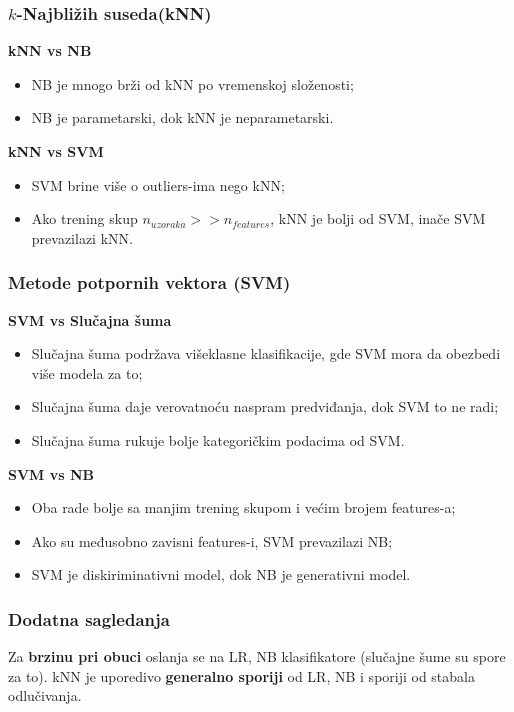 \documentclass[fontsize=12bp, paper=a4]{scrarticle}
\begin{document}
\subsubsection{$k$-Najbližih suseda(kNN)}
\textbf{kNN vs NB}
\begin{itemize}
    \item NB je mnogo brži od kNN po vremenskoj složenosti;
    \item NB je parametarski, dok kNN je neparametarski.
\end{itemize}

\textbf{kNN vs SVM}
\begin{itemize}
    \item SVM brine više  o outliers-ima nego kNN;
    \item Ako trening skup $n_{uzoraka} >> n_{features}$, kNN je bolji od SVM, inače SVM prevazilazi kNN.
\end{itemize}

\subsubsection{Metode potpornih vektora (SVM)}
\textbf{SVM vs Slučajna šuma}
\begin{itemize}
    \item Slučajna šuma podržava višeklasne klasifikacije, gde SVM mora da obezbedi više modela za to;
    \item Slučajna šuma daje verovatnoću naspram predviđanja, dok SVM to ne radi;
    \item Slučajna šuma rukuje bolje kategoričkim podacima od SVM.
\end{itemize}

\textbf{SVM vs NB}
\begin{itemize}
    \item Oba rade bolje sa manjim trening skupom i većim brojem features-a;
    \item Ako su međusobno zavisni features-i, SVM prevazilazi NB;
    \item SVM je diskiriminativni model, dok NB je generativni model.
\end{itemize}

\subsubsection*{Dodatna sagledanja\cite{comparison}}
Za \textbf{brzinu pri obuci} oslanja se na LR, NB klasifikatore (slučajne šume su spore za to). kNN je uporedivo \textbf{generalno sporiji} od LR, NB i sporiji od stabala odlučivanja. 
\end{document}
